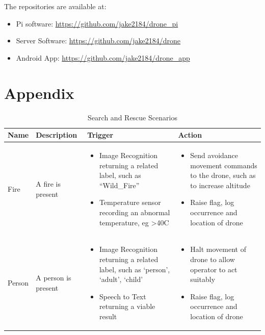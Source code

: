 \documentclass{article}
\begin{document}
The repositories are available at: 
\begin{itemize}
	\item Pi software: \url{https://github.com/jake2184/drone_pi}
	\item Server Software: \url{https://github.com/jake2184/drone}
	\item Android App: \url{https://github.com/jake2184/drone_app}
\end{itemize}





\section{Appendix}

\begin{table}[h]
\caption{Search and Rescue Scenarios\label{scenarios}}
\hyphenchar{}
\centering
\begin{tabularx}{\textwidth}{| >{\centering}m{1.5cm} | >{\centering}m{2cm} | X | X |}
    \hline
    Name & Description & Trigger & Action \\ \hline
    Fire & \vspace{\baselineskip} A fire is present &
    \begin{itemize}[topsep=0pt, leftmargin=0cm,itemindent=.5cm,labelwidth=\itemindent,labelsep=0cm,align=left]
        \item Image Recognition returning a related label, such as “Wild\_Fire”
        \item Temperature sensor recording an abnormal temperature, eg >40C
    \end{itemize} &
    \begin{itemize} [topsep=0pt, leftmargin=0cm,itemindent=.5cm,labelwidth=\itemindent,labelsep=0cm,align=left]
        \item Send avoidance movement commands to the drone, such as to increase altitude
        \item Raise flag, log occurrence and location of drone
    \end{itemize} \\ \hline

    Person & \vspace{\baselineskip} A person is present &
    \begin{itemize} [topsep=0pt, leftmargin=0cm,itemindent=.5cm,labelwidth=\itemindent,labelsep=0cm,align=left]
        \item Image Recognition returning a related label, such as `person', `adult', `child'
        \item Speech to Text returning a viable result
    \end{itemize} &
    \begin{itemize} [topsep=0pt, leftmargin=0cm,itemindent=.5cm,labelwidth=\itemindent,labelsep=0cm,align=left]
        \item Halt movement of drone to allow operator to act suitably
        \item Raise flag, log occurrence and location of drone
    \end{itemize} \\ \hline


\end{tabularx}
\end{table}
\end{document}
